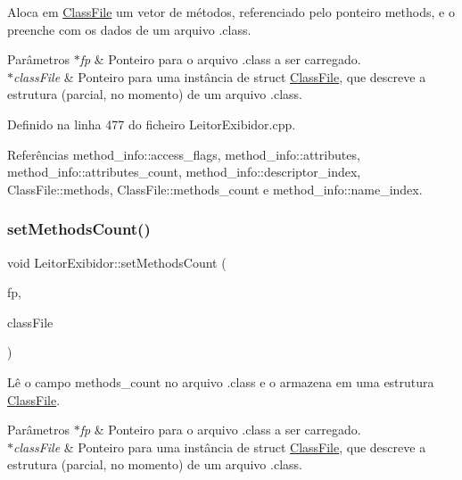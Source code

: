 Aloca em \hyperlink{classClassFile}{Class\+File} um vetor de métodos, referenciado pelo ponteiro methods, e o preenche com os dados de um arquivo .class. 
\begin{DoxyParams}{Parâmetros}
{\em $\ast$fp} & Ponteiro para o arquivo .class a ser carregado. \\
\hline
{\em $\ast$class\+File} & Ponteiro para uma instância de struct \hyperlink{classClassFile}{Class\+File}, que descreve a estrutura (parcial, no momento) de um arquivo .class. \\
\hline
\end{DoxyParams}


Definido na linha 477 do ficheiro Leitor\+Exibidor.\+cpp.



Referências method\+\_\+info\+::access\+\_\+flags, method\+\_\+info\+::attributes, method\+\_\+info\+::attributes\+\_\+count, method\+\_\+info\+::descriptor\+\_\+index, Class\+File\+::methods, Class\+File\+::methods\+\_\+count e method\+\_\+info\+::name\+\_\+index.

\mbox{\label{classLeitorExibidor_a6292517ec3beae1ef6ff67678110e961}} 
\subsubsection{\texorpdfstring{set\+Methods\+Count()}{setMethodsCount()}}
{\footnotesize\ttfamily void Leitor\+Exibidor\+::set\+Methods\+Count (\begin{DoxyParamCaption}\item[{F\+I\+LE $\ast$}]{fp,  }\item[{\hyperlink{classClassFile}{Class\+File} $\ast$}]{class\+File }\end{DoxyParamCaption})\hspace{0.3cm}{\ttfamily [private]}}

Lê o campo methods\+\_\+count no arquivo .class e o armazena em uma estrutura \hyperlink{classClassFile}{Class\+File}. 
\begin{DoxyParams}{Parâmetros}
{\em $\ast$fp} & Ponteiro para o arquivo .class a ser carregado. \\
\hline
{\em $\ast$class\+File} & Ponteiro para uma instância de struct \hyperlink{classClassFile}{Class\+File}, que descreve a estrutura (parcial, no momento) de um arquivo .class. \\
\hline
\end{DoxyParams}


